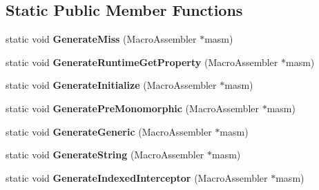 \subsection*{Static Public Member Functions}
\begin{DoxyCompactItemize}
\item 
\hypertarget{classv8_1_1internal_1_1_keyed_load_i_c_a9d1426ec0831318f33f95566c556a360}{}static void {\bfseries Generate\+Miss} (Macro\+Assembler $\ast$masm)\label{classv8_1_1internal_1_1_keyed_load_i_c_a9d1426ec0831318f33f95566c556a360}

\item 
\hypertarget{classv8_1_1internal_1_1_keyed_load_i_c_ae86f7cdcc4ff0b505a11b2c4a1fa526b}{}static void {\bfseries Generate\+Runtime\+Get\+Property} (Macro\+Assembler $\ast$masm)\label{classv8_1_1internal_1_1_keyed_load_i_c_ae86f7cdcc4ff0b505a11b2c4a1fa526b}

\item 
\hypertarget{classv8_1_1internal_1_1_keyed_load_i_c_a46a6f9a452a84dfb98994a036bb760d5}{}static void {\bfseries Generate\+Initialize} (Macro\+Assembler $\ast$masm)\label{classv8_1_1internal_1_1_keyed_load_i_c_a46a6f9a452a84dfb98994a036bb760d5}

\item 
\hypertarget{classv8_1_1internal_1_1_keyed_load_i_c_a42d151045a53a5b51d00acff8e4b1ae1}{}static void {\bfseries Generate\+Pre\+Monomorphic} (Macro\+Assembler $\ast$masm)\label{classv8_1_1internal_1_1_keyed_load_i_c_a42d151045a53a5b51d00acff8e4b1ae1}

\item 
\hypertarget{classv8_1_1internal_1_1_keyed_load_i_c_af8b494c4a51a1efa1bb28b87d72616d4}{}static void {\bfseries Generate\+Generic} (Macro\+Assembler $\ast$masm)\label{classv8_1_1internal_1_1_keyed_load_i_c_af8b494c4a51a1efa1bb28b87d72616d4}

\item 
\hypertarget{classv8_1_1internal_1_1_keyed_load_i_c_ac2ed18abaf27e066d2753813eb3e9ea4}{}static void {\bfseries Generate\+String} (Macro\+Assembler $\ast$masm)\label{classv8_1_1internal_1_1_keyed_load_i_c_ac2ed18abaf27e066d2753813eb3e9ea4}

\item 
\hypertarget{classv8_1_1internal_1_1_keyed_load_i_c_aa67f8ff93a58063fac37c704d20002a8}{}static void {\bfseries Generate\+Indexed\+Interceptor} (Macro\+Assembler $\ast$masm)\label{classv8_1_1internal_1_1_keyed_load_i_c_aa67f8ff93a58063fac37c704d20002a8}


\end{DoxyCompactItemize}
